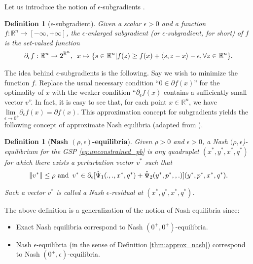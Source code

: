 \documentclass{article} %
\newtheorem{definition}[theorem]{Definition}
\begin{document}
Let us introduce the notion of $\epsilon$-subgradients
\cite{he2013accelerating}.

\begin{definition}[$\epsilon$-subgradient]
Given a scalar $\epsilon > 0$ and a function $f:\mathbb{R}^n
\rightarrow [-\infty,+\infty]$, the $\epsilon$-enlarged subgradient (or
$\epsilon$-subgradient, for short) of $f$ is the set-valued function
\begin{eqnarray}
\partial_\epsilon f: \mathbb{R}^n \rightarrow
2^{\mathbb{R}^n}, \hspace{.5em} x \mapsto \{s \in \mathbb{R}^n | f(z)
\ge f(x) + \langle s, z - x\rangle - \epsilon,\forall z \in
\mathbb{R}^n\}.
\end{eqnarray}
\end{definition}

The idea behind $\epsilon$-subgradients is the following. Say we wish
to minimize the function $f$. Replace the usual necessary
condition ``$0 \in \partial f(x)$'' for the optimality of $x$ with the
weaker condition ``$\partial_\epsilon f(x)$ contains a sufficiently
small vector $v$''. In fact, it is easy to see that, for each
point $x \in \mathbb{R}^n$, we have $\underset{\epsilon \rightarrow
  0^+}{\text{lim }}\partial_\epsilon f(x) = \partial f(x)$.
This approximation concept for subgradients yields the following
concept of approximate Nash equlibria (adapted from
\cite{he2013accelerating}).

\begin{definition}[\textbf{Nash $(\rho,\epsilon)$-equilibria}]
Given $\rho > 0$ and $\epsilon > 0$, a Nash
$(\rho,\epsilon$)-equilibrium for the GSP \eqref{eq:unconstrained_pb}
is any quadruplet $(x^*, y^*, x^*, q^*)$ for which
there exists a perturbation vector $v^*$ such that
\begin{eqnarray}
\|v^*\| \le \rho \text{ and}\hspace{.5em} v^* \in
\partial_\epsilon[\hat{\Psi}_1(., ., x^*, q^*) +
  \hat{\Psi}_2(y^*, p^*, , .)](y^*,p^*,x^*,q^*).
\end{eqnarray}

Such a vector $v^*$ is called a Nash $\epsilon$-residual at $(x^*,
y^*, x^*, q^*)$.
\label{thm:cool_notion}
\end{definition}


The above definition is a generalization of the notion of Nash
equilibria since:
\begin{itemize}
\item Exact Nash equilibria correspond to Nash $(0^+,0^+)$-equilibria.
\item Nash $\epsilon$-equilibria (in the sense of Definition
  \ref{thm:approx_nash}) correspond to Nash $(0^+,\epsilon)$-equilibria.
\end{itemize}
\end{document}
